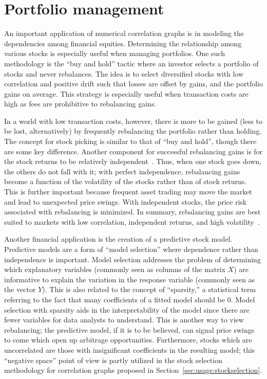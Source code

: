 \section{Portfolio management}
\label{sec:intro:finance}

An important application of numerical correlation graphs is in modeling the 
dependencies 
among financial equities. Determining the relationship among various stocks is 
especially useful when managing portfolios. One such methodology is the ``buy 
and hold'' tactic where an investor selects a portfolio of stocks and never 
rebalances. The idea is to select diversified stocks with low correlation and 
positive drift such that losses are offset by gains, and the portfolio gains on 
average. This strategy is especially useful when transaction costs are high as 
fees are prohibitive to rebalancing gains. 

In a world with low transaction costs, however, there is more to be gained 
(less to be lost, alternatively) by frequently rebalancing the portfolio rather 
than holding. The concept for stock picking is similar to that of ``buy and 
hold'', though there are some key difference. Another component for successful 
rebalancing gains is for the stock returns to be relatively 
independent~\cite{liuh2016}. Thus, when one stock goes down, the others do not 
fall with it; with perfect independence, rebalancing gains become a function of 
the volatility of the stocks rather than of stock returns. This is further 
important because frequent asset trading may move the market and lead to 
unexpected price swings. With independent stocks, the price risk associated 
with rebalancing is minimized. In summary, rebalancing gains are best suited to 
markets with low correlation, independent returns, and high 
volatility~\cite{liuh2016}.  

Another financial application is the creation of a predictive stock model. 
Predictive models are a form of ``model selection'' where dependence rather 
than independence is important. Model selection addresses the problem of 
determining which explanatory variables (commonly seen as columns of the matrix 
$X$) are informative to explain the variation in the response variable 
(commonly seen as the vector $Y$). This is also related to the concept of 
``sparsity,'' a statistical term referring to the fact that many coefficients 
of a fitted model should be 0. Model selection with sparsity aids in the 
interpretability of the model since there are fewer variables for data analysts 
to understand. This is another way to view rebalancing; the predictive model, 
if it is to be believed, can signal price swings to come which open up 
arbitrage opportunities. Furthermore, stocks which are uncorrelated are those 
with insignificant coefficients in the resulting model; this ``negative space'' 
point of view is partly utilized in the stock selection methodology for 
correlation graphs proposed in  Section~\ref{sec:usage:stockselection}.

